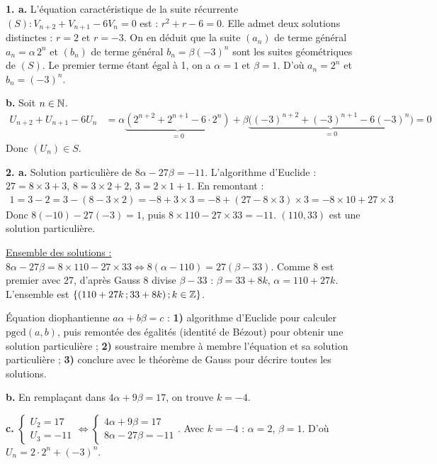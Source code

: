 \documentclass[11pt]{article}
\begin{document}


\textbf{1. a.} L'équation caractéristique de la suite récurrente $(S) : V_{n+2} + V_{n+1} - 6V_n = 0$ est : $r^2 + r - 6 = 0$. Elle admet deux solutions distinctes : $r = 2$ et $r = -3$. On en déduit que la suite $(a_n)$ de terme général $a_n = \alpha\,2^n$ et $(b_n)$ de terme général $b_n = \beta(-3)^n$ sont les suites géométriques de $(S)$. Le premier terme étant égal à 1, on a $\alpha = 1$ et $\beta = 1$. D'où $a_n = 2^n$ et $b_n = (-3)^n$.

\textbf{b.} Soit $n \in \mathbb{N}$.
\begin{align*}
U_{n+2} + U_{n+1} - 6U_n &= \alpha\underbrace{(2^{n+2} + 2^{n+1} - 6\cdot 2^n)}_{=0} + \beta\underbrace{\big((-3)^{n+2} + (-3)^{n+1} - 6(-3)^n\big)}_{=0} = 0
\end{align*}
Donc $(U_n) \in S$.

\textbf{2. a.} Solution particulière de $8\alpha - 27\beta = -11$. L'algorithme d'Euclide : $27 = 8 \times 3 + 3$, $8 = 3 \times 2 + 2$, $3 = 2 \times 1 + 1$. En remontant :
\begin{align*}
1 = 3 - 2 = 3 - (8 - 3\times2) = -8 + 3\times3 = -8 + (27 - 8\times3)\times3 = -8 \times 10 + 27 \times 3
\end{align*}
Donc $8(-10) - 27(-3) = 1$, puis $8 \times 110 - 27 \times 33 = -11$. $(110, 33)$ est une solution particulière.

\underline{Ensemble des solutions :} $8\alpha - 27\beta = 8 \times 110 - 27 \times 33 \Leftrightarrow 8(\alpha - 110) = 27(\beta - 33)$. Comme 8 est premier avec 27, d'après Gauss 8 divise $\beta - 33$ : $\beta = 33 + 8k$, $\alpha = 110 + 27k$. L'ensemble est $\{(110 + 27k\,;33 + 8k)\,;k \in \mathbb{Z}\}$.

\begin{methode}
Équation diophantienne $a\alpha + b\beta = c$ : \textbf{1)} algorithme
d'Euclide pour calculer $\mathrm{pgcd}(a,b)$, puis remontée des égalités
(identité de Bézout) pour obtenir une solution particulière ;
\textbf{2)} soustraire membre à membre l'équation et sa solution
particulière ; \textbf{3)} conclure avec le théorème de Gauss pour
décrire toutes les solutions.
\end{methode}

\textbf{b.} En remplaçant dans $4\alpha + 9\beta = 17$, on trouve $k = -4$.

\textbf{c.} $\begin{cases} U_2 = 17 \\ U_3 = -11 \end{cases} \Leftrightarrow \begin{cases} 4\alpha + 9\beta = 17 \\ 8\alpha - 27\beta = -11 \end{cases}$. Avec $k = -4$ : $\alpha = 2$, $\beta = 1$. D'où $U_n = 2\cdot 2^n + (-3)^n$.
\end{document}
